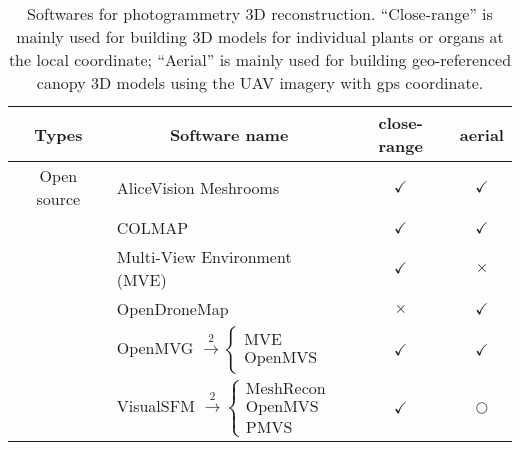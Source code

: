 \begin{table}[htb]
  \caption[Softwares for photogrammetry 3D reconstruction]{Softwares for photogrammetry 3D reconstruction. ``Close-range'' is mainly used for building 3D models for individual plants or organs at the local coordinate; ``Aerial'' is mainly used for building geo-referenced canopy 3D models using the UAV imagery with \gls{gps} coordinate.}
  \label{tbl:int1}
    \begin{center}
      \begin{threeparttable}
      \begin{tabular*}{\linewidth}{@{\extracolsep{\fill}} clcc}
        \hline
        \multicolumn{1}{c}{\textbf{Types}} & \multicolumn{1}{c}{\textbf{Software name}}                                                                      & \textbf{close-range} & \textbf{aerial}     \\ \hline
        Open source                        & AliceVision Meshrooms                                                                                           & $\checkmark$         & $\checkmark$        \\
                                           & COLMAP                                                                                                          & $\checkmark$         & $\checkmark$        \\
                                           & Multi-View Environment (MVE)                                                                                    & $\checkmark$         & $\times$            \\
                                           & OpenDroneMap\tnote{1}                                                                                           & $\times$             & $\checkmark$        \\
                                           & OpenMVG $\stackrel{2}{\rightarrow} \begin{cases} \text{MVE} \\ \text{OpenMVS} \end{cases}$                      & $\checkmark$         & $\checkmark$        \\
                                           & VisualSFM $\stackrel{2}{\rightarrow} \begin{cases}\text{MeshRecon}\\ \text{OpenMVS} \\ \text{PMVS} \end{cases}$ & $\checkmark$         & $\bigcirc$\tnote{3} \\

\end{tabular*}
\end{threeparttable}
\end{center}
\end{table}
